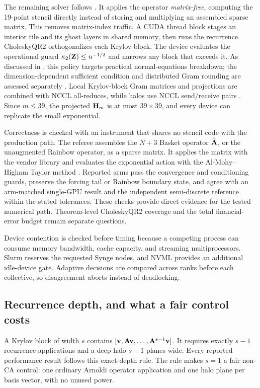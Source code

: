 The remaining solver follows . It applies the operator \emph{matrix-free}, computing the 19-point stencil directly instead of storing and multiplying an assembled sparse matrix. This removes matrix-index traffic. A CUDA thread block stages an interior tile and its ghost layers in shared memory, then runs the recurrence. CholeskyQR2 orthogonalizes each Krylov block. The device evaluates the operational guard $\kappa_2(\mathbf{Z})\le u^{-1/2}$ and narrows any block that exceeds it. As discussed in , this policy targets practical normal-equations breakdown; the dimension-dependent sufficient condition and distributed Gram rounding are assessed separately \cite{yamamoto-2015,fukaya-2014}. Local Krylov-block Gram matrices and projections are combined with NCCL all-reduces, while halos use NCCL send/receive pairs \cite{yamazaki-2014}. Since $m\le39$, the projected $\mathbf{H}_m$ is at most $39\times39$, and every device can replicate the small exponential.

Correctness is checked with an instrument that shares no stencil code with the production path. The referee assembles the $N+3$ Basket operator $\widetilde{\mathbf{A}}$, or the unaugmented Rainbow operator, as a sparse matrix. It applies the matrix with the vendor library and evaluates the exponential action with the Al-Mohy--Higham Taylor method \cite{almohy-higham-2011}. Reported arms pass the convergence and conditioning guards, preserve the forcing tail or Rainbow boundary state, and agree with an arm-matched single-GPU result and the independent semi-discrete reference within the stated tolerances. These checks provide direct evidence for the tested numerical path. Theorem-level CholeskyQR2 coverage and the total financial-error budget remain separate questions.

Device contention is checked before timing because a competing process can consume memory bandwidth, cache capacity, and streaming multiprocessors. Slurm reserves the requested Synge nodes, and NVML provides an additional idle-device gate. Adaptive decisions are compared across ranks before each collective, so disagreement aborts instead of deadlocking.

\subsection{Recurrence depth, and what a fair control costs}\label{sec:integrator-depth}

A Krylov block of width $s$ contains $[\mathbf{v},\mathbf{A}\mathbf{v},\ldots,\mathbf{A}^{s-1}\mathbf{v}]$. It requires exactly $s-1$ recurrence applications and a deep halo $s-1$ planes wide. Every reported performance result follows this exact-depth rule. The rule makes $s=1$ a fair non-CA control: one ordinary Arnoldi operator application and one halo plane per basis vector, with no unused power.


